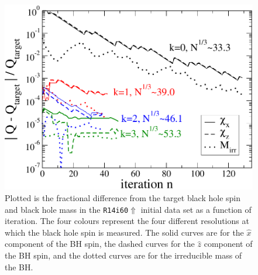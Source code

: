 \begin{figure}
\includegraphics[width=0.95\columnwidth]{chap4/BHSpinConv}
\caption[Convergence of black hole spin and
mass.]{\label{Fig:BHSpinConv} Plotted is the fractional difference from the target black hole spin and black hole mass in the {\tt R14i60$\Uparrow$} initial data set as a function of iteration. The four colours represent 
the four different resolutions at which the black hole spin is measured. The solid curves are for the $\hat{x}$ component of the BH spin, the dashed curves for the $\hat{z}$ component of the BH spin, and
the dotted curves are for the irreducible mass of the BH.}
\end{figure}

